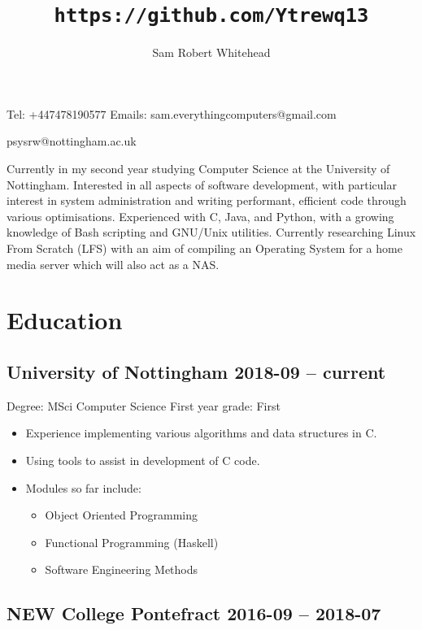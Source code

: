 \documentclass[9pt]{extarticle}
\renewcommand{\maketitle}{\begin{center}\huge\bfseries\theauthor\end{center}\begin{center}\Large\thetitle\end{center}}
\begin{document}
    \title{\texttt{https://github.com/Ytrewq13}}
    \author{Sam Robert Whitehead}

    \maketitle

    Tel: +447478190577
    \hfill
    Emails: sam.everythingcomputers@gmail.com
    \begin{flushright}
        psysrw@nottingham.ac.uk
    \end{flushright}
    Currently in my second year studying Computer Science at the University of Nottingham. Interested in all aspects of software development, with particular interest in system administration and writing performant, efficient code through various optimisations. Experienced with C, Java, and Python, with a growing knowledge of Bash scripting and GNU/Unix utilities. Currently researching Linux From Scratch (LFS) with an aim of compiling an Operating System for a home media server which will also act as a NAS.
    \section{Education}
    \subsection{University of Nottingham
    \hfill 2018-09 -- current}
    Degree: MSci Computer Science
    \hfill
    First year grade: First
    \begin{itemize}
        \item Experience implementing various algorithms and data structures in C.
        \item Using tools to assist in development of C code.
        \item Modules so far include:
            \begin{itemize}
                \item Object Oriented Programming
                \item Functional Programming (Haskell)
                \item Software Engineering Methods
            \end{itemize}
    \end{itemize}
    \subsection{NEW College Pontefract
    \hfill 2016-09 -- 2018-07}
\end{document}

